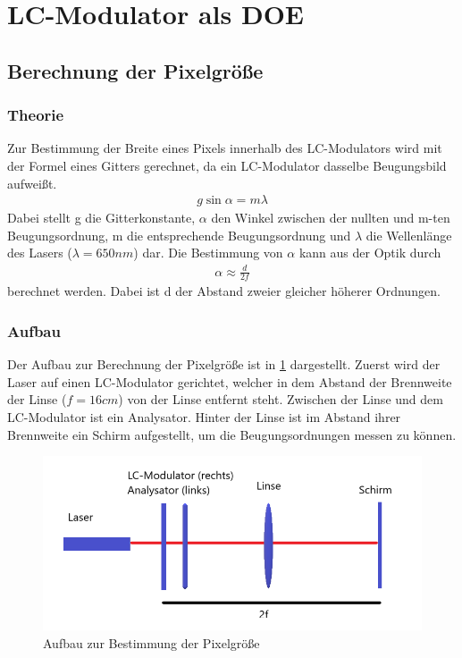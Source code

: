 \section{LC-Modulator als DOE}
\subsection{Berechnung der Pixelgröße}
\subsubsection{Theorie}
Zur Bestimmung der Breite eines Pixels innerhalb des LC-Modulators wird mit der Formel eines Gitters gerechnet, da ein LC-Modulator dasselbe Beugungsbild aufweißt.
\begin{align}
	g\sin{\alpha} = m\lambda
	\label{gbestimm}
\end{align}
Dabei stellt g die Gitterkonstante, $\alpha$ den Winkel zwischen der nullten und m-ten Beugungsordnung, m die entsprechende Beugungsordnung und $\lambda$ die Wellenlänge des Lasers ($\lambda = 650nm$) dar.
Die Bestimmung von $\alpha$ kann aus der Optik durch
\begin{align}
	\alpha \approx \frac{d}{2f}
	\label{abestimm}
\end{align}
berechnet werden. Dabei ist d der Abstand zweier gleicher höherer Ordnungen. 
\subsubsection{Aufbau}
Der Aufbau zur Berechnung der Pixelgröße ist in \cref{421} dargestellt.
Zuerst wird der Laser auf einen LC-Modulator gerichtet, welcher in dem Abstand der Brennweite der Linse ($f = 16cm$) von der Linse entfernt steht. Zwischen der Linse und dem LC-Modulator ist ein Analysator. Hinter der Linse ist im Abstand ihrer Brennweite ein Schirm aufgestellt, um die Beugungsordnungen messen zu können. 
\begin{figure}[h!]
	\centering
	\includegraphics[scale = 1]{4.2.1-Aufbau.png}
	\caption{Aufbau zur Bestimmung der Pixelgröße}
	\label{421}
\end{figure}
